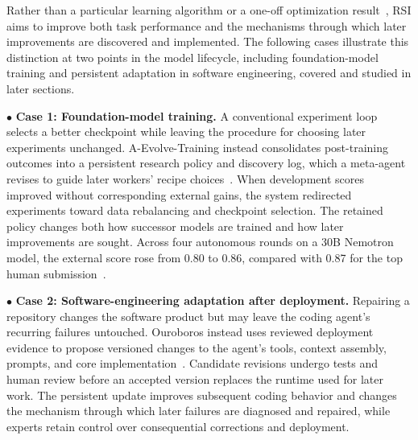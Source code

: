 Rather than a particular learning algorithm or a one-off optimization result~\cite{schmidhuber2003godel,zelikman2024stop,zhang2026dgm}, RSI aims to improve both task performance and the mechanisms through which later improvements are discovered and implemented. The following cases illustrate this distinction at two points in the model lifecycle, including foundation-model training and persistent adaptation in software engineering, covered and studied in later sections.







\noindent$\bullet$ \textbf{Case 1: Foundation-model training.} A conventional experiment loop selects a better checkpoint while leaving the procedure for choosing later experiments unchanged. A-Evolve-Training instead consolidates post-training outcomes into a persistent research policy and discovery log, which a meta-agent revises to guide later workers' recipe choices~\cite{shi2026aevolvetraining}. When development scores improved without corresponding external gains, the system redirected experiments toward data rebalancing and checkpoint selection. The retained policy changes both how successor models are trained and how later improvements are sought. Across four autonomous rounds on a 30B Nemotron model, the external score rose from 0.80 to 0.86, compared with 0.87 for the top human submission~\cite{shi2026aevolvetraining}.

\noindent$\bullet$ \textbf{Case 2: Software-engineering adaptation after deployment.} Repairing a repository changes the software product but may leave the coding agent's recurring failures untouched. Ouroboros instead uses reviewed deployment evidence to propose versioned changes to the agent's tools, context assembly, prompts, and core implementation~\cite{razzhigaev2026ouroboros}. Candidate revisions undergo tests and human review before an accepted version replaces the runtime used for later work. The persistent update improves subsequent coding behavior and changes the mechanism through which later failures are diagnosed and repaired, while experts retain control over consequential corrections and deployment.

